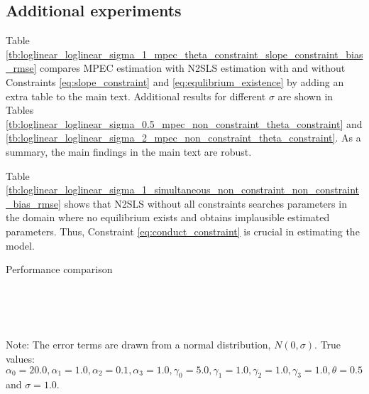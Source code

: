 \documentclass[11pt, a4paper]{article}
\begin{document}
\subsection{Additional experiments}\label{sec:additional_experiments}

Table \ref{tb:loglinear_loglinear_sigma_1_mpec_theta_constraint_slope_constraint_bias_rmse} compares MPEC estimation with N2SLS estimation with and without Constraints \eqref{eq:slope_constraint} and \eqref{eq:equlibrium_existence} by adding an extra table to the main text.
Additional results for different $\sigma$ are shown in Tables \ref{tb:loglinear_loglinear_sigma_0.5_mpec_non_constraint_theta_constraint} and \ref{tb:loglinear_loglinear_sigma_2_mpec_non_constraint_theta_constraint}. 
As a summary, the main findings in the main text are robust.

Table \ref{tb:loglinear_loglinear_sigma_1_simultaneous_non_constraint_non_constraint_bias_rmse} shows that N2SLS without all constraints searches parameters in the domain where no equilibrium exists and obtains implausible estimated parameters.
Thus, Constraint \eqref{eq:conduct_constraint} is crucial in estimating the model.

\begin{table}[!htbp]
  \begin{center}
      \caption{Performance comparison}
      \label{tb:loglinear_loglinear_sigma_1_mpec_theta_constraint_slope_constraint_bias_rmse} 
    \\
    \\
    \subfloat[MPEC ]{}\\
  \end{center}
  \footnotesize
  Note: The error terms are drawn from a normal distribution, $N(0, \sigma)$. True values: $\alpha_0=20.0,\alpha_1=1.0,\alpha_2=0.1,\alpha_3=1.0,\gamma_0=5.0,\gamma_1=1.0,\gamma_2=1.0,\gamma_3=1.0,\theta=0.5$ and $\sigma=1.0$.
\end{table} 
\end{document}
